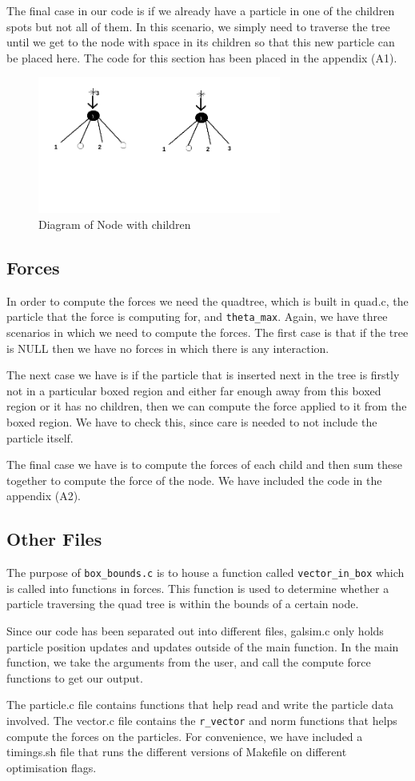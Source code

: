The final case in our code is if we already have a particle in one of the children spots but not all of them. In this scenario, we simply need to traverse the tree until we get to the node with space in its children so that this new particle can be placed here. The code for this section has been placed in the appendix (A1).
\begin{figure}[htb]
  \begin{center}
    \includegraphics[width=8cm]{../images/children.png}
    \caption{Diagram of Node with children}
  \end{center}
\end{figure}

\newpage
\subsection{Forces}
In order to compute the forces we need the quadtree, which is built in quad.c, the particle that the force is computing for, and \verb|theta_max|. Again, we have three scenarios in which we need to compute the forces. The first case is that if the tree is NULL then we have no forces in which there is any interaction.

The next case we have is if the particle that is inserted next in the tree is firstly not in a particular boxed region and either far enough away from this boxed region or it has no children, then we can compute the force applied to it from the boxed region. We have to check this, since care is needed to not include the particle itself.

The final case we have is to compute the forces of each child and then sum these together to compute the force of the node. We have included the code in the appendix (A2).
\subsection{Other Files}
The purpose of \verb|box_bounds.c| is to house a function called \verb|vector_in_box| which is called into functions in forces. This function is used to determine whether a particle traversing the quad tree is within the bounds of a certain node.

Since our code has been separated out into different files, galsim.c only holds particle position updates and updates outside of the main function. In the main function, we take the arguments from the user, and call the compute force functions to get our output.

The particle.c file contains functions that help read and write the particle data involved. The vector.c file contains the \verb|r_vector| and norm functions that helps compute the forces on the particles. For convenience, we have included a timings.sh file that runs the different versions of Makefile on different optimisation flags.
\newpage
